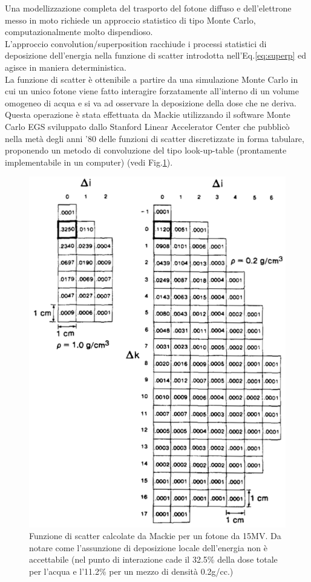 {Una modellizzazione completa del trasporto del fotone diffuso e dell'elettrone messo in moto richiede un approccio statistico di tipo Monte Carlo, computazionalmente molto dispendioso.\\
L'approccio convolution/superposition racchiude i processi statistici di deposizione dell'energia nella funzione di scatter introdotta nell'Eq.\eqref{eq:superp} ed agisce in maniera deterministica.\\
La funzione di scatter è ottenibile a partire da una simulazione Monte Carlo in cui un unico fotone viene fatto interagire forzatamente all'interno di un volume omogeneo di acqua e si va ad osservare la deposizione della dose che ne deriva.\\
Questa operazione è stata effettuata da Mackie \cite{Mackie1985} utilizzando il software Monte Carlo EGS sviluppato dallo Stanford Linear Accelerator Center che pubblicò nella metà degli anni '80 delle funzioni di scatter discretizzate in forma tabulare, proponendo un metodo di convoluzione del tipo look-up-table (prontamente implementabile in un computer) (vedi Fig.\ref{fig:mackie_kernels}).
\begin{figure}
\centering
\includegraphics[width=.8\textwidth]{./cap1/mackie_kernels.png}
\caption{Funzione di scatter calcolate da Mackie \cite{Mackie1985} per un fotone da 15MV. Da notare come l'assunzione di deposizione locale dell'energia non è accettabile (nel punto di interazione cade il 32.5\% della dose totale per l'acqua e l'11.2\% per un mezzo di densità 0.2g/cc.)}
\label{fig:mackie_kernels}
\end{figure}

}
